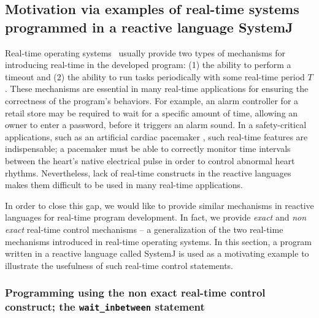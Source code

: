 \subsection{Motivation via examples of real-time systems programmed in a
reactive language SystemJ}
\label{sec:motivating-example}


Real-time operating systems~\cite{barry2009using} usually provide two
types of mechanisms for introducing real-time in the developed program:
(1) the ability to perform a timeout and (2) the ability to run tasks
periodically with some real-time period $T$. These mechanisms are
essential in many real-time applications for ensuring the correctness of
the program's behaviors. For example, an alarm controller for a retail
store may be required to wait for a specific amount of time, allowing an
owner to enter a password, before it triggers an alarm sound. In a
safety-critical applications, such as an artificial cardiac pacemaker
\cite{Singh:2012:CPC:2388936.2388948}, such real-time features are
indispensable; a pacemaker must be able to correctly monitor time
intervals between the heart's native electrical pulse in order to
control abnormal heart rhythms. Nevertheless, lack of real-time
constructs in the reactive languages \cite{gber931,amal10} makes them
difficult to be used in many real-time applications.

In order to close this gap, we would like to provide similar mechanisms
in reactive languages for real-time program development. In fact, we
provide \textit{exact} and \textit{non exact} real-time control
mechanisms -- a generalization of the two real-time mechanisms
introduced in real-time operating systems. In this section, a program
written in a reactive language called SystemJ is used as a motivating
example to illustrate the usefulness of such real-time control
statements.

\subsubsection{Programming using the non exact real-time control
  construct; the \textrm{\texttt{wait\_inbetween}} statement}
\label{sec:progr-using-non}

